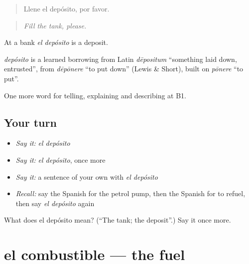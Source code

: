 \begin{quote}
Llene el depósito, por favor.
\end{quote}

\begin{quote}
\emph{Fill the tank, please.}
\end{quote}

At a bank \emph{el depósito} is a deposit.

\begin{cousinweb}
\emph{depósito} is a learned borrowing from Latin \emph{dēpositum} \textquotedblleft{}something laid down, entrusted\textquotedblright{}, from \emph{dēpōnere} \textquotedblleft{}to put down\textquotedblright{} (Lewis \& Short), built on \emph{pōnere} \textquotedblleft{}to put\textquotedblright{}.
\end{cousinweb}

\begin{grammarlens}[title={What you've built}]
One more word for telling, explaining and describing at B1.
\end{grammarlens}

\subsection*{Your turn}
\begin{itemize}
\raggedright
  \item \emph{Say it:} \emph{el depósito}
  \item \emph{Say it:} \emph{el depósito}, once more
  \item \emph{Say it:} a sentence of your own with \emph{el depósito}
  \item \emph{Recall:} say the Spanish for the petrol pump, then the Spanish for to refuel, then say \emph{el depósito} again
\end{itemize}

\begin{tcolorbox}[breakable,colback=teal!4,colframe=teal!35!black,title={Before you move on}]
What does el depósito mean? (\textquotedblleft{}The tank; the deposit\textquotedblright{}.) Say it once more.
\end{tcolorbox}
\section[el combustible]{el combustible — the fuel}

\label{lesson:ES-C646-combustible}



